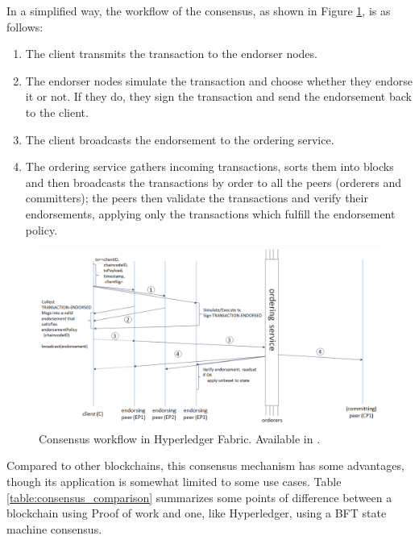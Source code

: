 In a simplified way, the workflow of the consensus, as shown in Figure \ref{fig:fabric_workflow},  is as follows:
\begin{enumerate}
\item The client transmits the transaction to the endorser nodes.
\item The endorser nodes simulate the transaction and choose whether they endorse it or not. If they do, they sign the transaction and send the endorsement back to the client.
\item The client broadcasts the endorsement to the ordering service.
\item The ordering service gathers incoming transactions, sorts them into blocks and then broadcasts the transactions by order to all the peers (orderers and committers); the peers then validate the transactions and verify their endorsements, applying only the transactions which fulfill the endorsement policy.
\end{enumerate}
\begin{figure}[h]
\centering
\includegraphics[scale=0.5]{media/fabric_workflow.png}
\caption[Consensus workflow in Hyperledger Fabric]{Consensus workflow in Hyperledger Fabric. Available in \cite{IBMResearch2017}.}
\label{fig:fabric_workflow}
\end{figure}

Compared to other blockchains, this consensus mechanism has some advantages, though its application is somewhat limited to some use cases. Table \ref{table:consensus_comparison} summarizes some points of difference between a blockchain using Proof of work and one, like Hyperledger, using a BFT state machine consensus.





